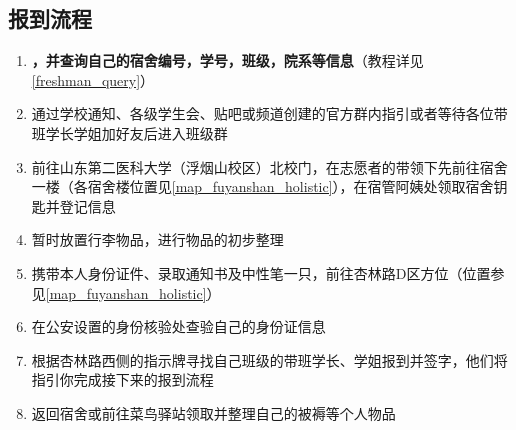 \subsection[报到流程]{报到流程}
\begin{enumerate}
      \item \textbf{，并查询自己的宿舍编号，学号，班级，院系等信息}\footnotemark（教程详见\uline{\ref{freshman_query}}）
      \item 通过学校通知、各级学生会、贴吧或频道创建的官方群内指引或者等待各位带班学长学姐加好友后进入班级群\footnotemark
      \item 前往山东第二医科大学（浮烟山校区）北校门，在志愿者\footnotemark 的带领下先前往宿舍一楼（各宿舍楼位置见\uline{\ref{map_fuyanshan_holistic}}），在宿管阿姨处领取宿舍钥匙并登记信息
      \item 暂时放置行李物品，进行物品的初步整理
      \item 携带本人身份证件、录取通知书\footnotemark 及中性笔一只，前往杏林路D区方位（位置参见\uline{\ref{map_fuyanshan_holistic}}）
      \item 在公安设置的身份核验处查验自己的身份证\footnotemark 信息
      \item 根据杏林路西侧的指示牌寻找自己班级的带班学长、学姐报到并签字，他们将指引你完成接下来的报到流程\footnotemark
      \item 返回宿舍或前往菜鸟驿站领取并整理自己的被褥等个人物品
\end{enumerate}